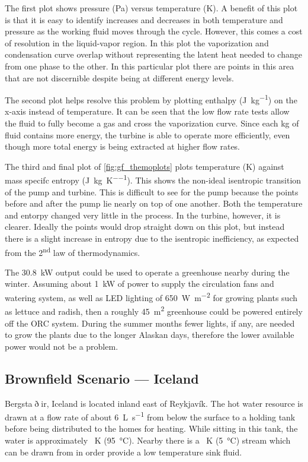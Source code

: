 The first plot shows pressure (\si{\pascal}) versus temperature (\si{\kelvin}). A benefit of this plot is that it is easy to identify increases and decreases in both temperature and pressure as the working fluid moves through the cycle. However, this comes a cost of resolution in the liquid-vapor region. In this plot the vaporization and condensation curve overlap without representing the latent heat needed to change from one phase to the other. In this particular plot there are points in this area that are not discernible despite being at different energy levels. 

The second plot helps resolve this problem by plotting enthalpy (\si[per-mode=symbol-or-fraction]{\joule\per\kilogram}) on the x-axis instead of temperature. It can be seen that the low flow rate tests allow the fluid to fully become a gas and cross the vaporization curve. Since each \si{\kilogram} of fluid contains more energy, the turbine is able to operate more efficiently, even though more total energy is being extracted at higher flow rates.

The third and final plot of \autoref{fig:gf_themoplots} plots temperature (\si{\kelvin}) against mass specifc entropy (\si[per-mode=symbol-or-fraction]{\joule\per\kilogram\per\kelvin}). This shows the non-ideal isentropic transition of the pump and turbine. This is difficult to see for the pump because the points before and after the pump lie nearly on top of one another. Both the temperature and entorpy changed very little in the process. In the turbine, however, it is clearer. Ideally the points would drop straight down on this plot, but instead there is a slight increase in entropy due to the isentropic inefficiency, as expected from the 2\textsuperscript{nd} law of thermodynamics. 

The \SI{30.8}{\kilo\watt} output could be used to operate a greenhouse nearby during the winter. Assuming about \SI{1}{\kilo\watt} of power to supply the circulation fans and watering system, as well as LED lighting of 
\SI{650}{\watt\per\meter\squared} \cite{Tamulaitis2005} for growing plants such as lettuce and radish, then a roughly \SI{45}{\meter\squared} greenhouse could be powered entirely off the ORC system. During the summer months fewer lights, if any, are needed to grow the plants due to the longer Alaskan days, therefore the lower available power would not be a problem.
\clearpage

\subsection{Brownfield Scenario --- Iceland}
Bergsta$\eth$ir, Iceland is located inland east of Reykjavík. The hot water resource is drawn at a flow rate of about \SI{6}{\liter\per\second} from below the surface to a holding tank before being distributed to the homes for heating. While sitting in this tank, the water is approximately \SI{}{\kelvin} (\SI{95}{\degreeCelsius}). Nearby there is a \SI{}{\kelvin} (\SI{5}{\degreeCelsius}) stream which can be drawn from in order provide a low temperature sink fluid.

